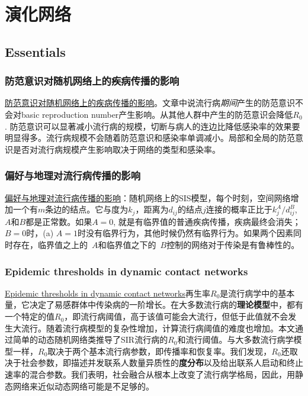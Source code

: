 \chapter{演化网络}

\section{Essentials}

\subsection{防范意识对随机网络上的疾病传播的影响}
\href{https://www.sciencedirect.com/science/article/pii/S002251931930459X}{防范意识对随机网络上的疾病传播的影响}。文章中说流行病\textit{期间}产生的防范意识不会对basic reproduction number产生影响。从其他人群中产生的防范意识会降低$R_0$. 防范意识可以显著减小流行病的规模，切断与病人的连边比降低感染率的效果要明显得多。流行病规模不会随着防范意识和感染率单调减小。局部和全局的防范意识是否对流行病规模产生影响取决于网络的类型和感染率。

\subsection{偏好与地理对流行病传播的影响}
\href{https://journals.aps.org/pre/abstract/10.1103/PhysRevE.76.056109}{偏好与地理对流行病传播的影响}：随机网络上的SIS模型，每个时刻，空间网络增加一个有$m$条边的结点。它与度为$k_{j}$，距离为$d_{ij}$的结点$j$连接的概率正比于$k^{A}_{j}/d^{B}_{ij}$, $A$和$B$都是正常数。如果$A=0$, 就是有临界值的普通疾病传播，疾病最终会消失；$B=0$时，(a) $A=1$时没有临界行为，其他时候仍然有临界行为。如果两个因素同时存在，临界值之上的~$A$和临界值之下的~$B$控制的网络对于传染是有鲁棒性的。

\subsection{Epidemic thresholds in dynamic contact networks}
\href{https://royalsocietypublishing.org/doi/pdf/10.1098/rsif.2008.0218}{Epidemic thresholds in dynamic contact networks}再生率$R_0$是流行病学中的基本量，它决定了易感群体中传染病的一阶增长。在大多数流行病的\textbf{理论模型}中，都有一个特定的值$R_0$，即流行病阈值，高于该值可能会大流行，但低于此值就不会发生大流行。随着流行病模型的复杂性增加，计算流行病阈值的难度也增加。本文通过简单的动态随机网络类推导了SIR流行病的$R_0$和流行阈值。与大多数流行病学模型一样，$R_0$取决于两个基本流行病参数，即传播率和恢复率。我们发现，$R_0$还取决于社会参数，即描述并发联系人数量异质性的\textbf{度分布}以及给出联系人启动和终止速率的混合参数。我们表明，社会融合从根本上改变了流行病学格局，因此，用静态网络来近似动态网络可能是不足够的。

